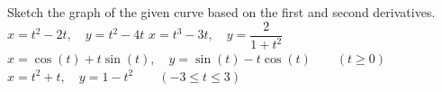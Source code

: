 \begin{Exercise}[label = oef_parameterkrommes_tekenen_afgeleiden] Sketch the graph of the given curve based on the first and second  derivatives.
\Question[difficulty = 1] $x = t^2-2t, \quad y = t^2-4t $ 
\ifanalysis\Question[difficulty = 1]\fi\ifcalculus\Question[difficulty = 2]\fi $x = t^3-3t, \quad y = \dfrac{2}{1+t^2} $
\Question[difficulty = 2] $x = \cos (t) + t\sin (t), \quad y = \sin (t) - t \cos(t) \qquad (t\geq 0)$ 
\Question[difficulty = 1] $ x = t^2+t, \quad y = 1-t^2  \qquad (-3  \leq t \leq 3) $
\end{Exercise}

